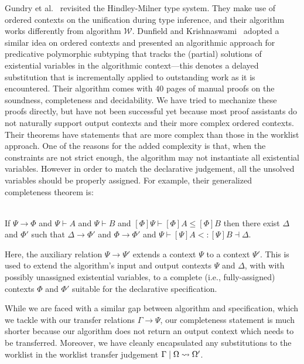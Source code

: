 Gundry et al.~\cite{gundry2010type} revisited the Hindley-Milner type system. They make use of ordered contexts on the unification during type inference, and their algorithm works differently from algorithm $\mathcal{W}$.
Dunfield and Krishnaswami~\cite{dunfield2013complete} adopted a similar idea on ordered contexts and presented an algorithmic approach for predicative polymorphic subtyping
that tracks the (partial) solutions of existential variables in the algorithmic
context---this denotes a delayed substitution that is incrementally applied
to outstanding work as it is encountered.  
Their algorithm comes with 40 pages of manual proofs on the soundness, completeness
and decidability. We have tried to
mechanize these proofs directly, but have not been successful yet because most proof assistants
do not naturally support output contexts and their more complex
ordered contexts.
Their theorems have statements that are more complex than those in the worklist
approach. One of the reasons for the added complexity is that, when the
constraints are not strict enough, the algorithm may not instantiate all
existential variables. However in order to match the declarative judgement,
all the unsolved variables should be properly assigned.
For example, their generalized completeness theorem is:
\begin{theorem}~\\
If $\Psi\longrightarrow \Phi$ and $\Psi\vdash A$ and $\Psi\vdash B$ and $[\Phi]\Psi\vdash [\Phi]A \le [\Phi]B$ then there exist $\Delta$ and $\Phi'$ such that $\Delta\longrightarrow\Phi'$ and $\Phi\longrightarrow\Phi'$ and $\Psi\vdash[\Psi]A <: [\Psi]B \dashv \Delta$.
\end{theorem}
Here, the auxiliary relation $\Psi\longrightarrow \Psi'$ extends a context
$\Psi$ to a context $\Psi'$. This is used to extend the algorithm's input and
output contexts $\Psi$ and $\Delta$, with with possibly unassigned existential
variables, to a complete (i.e., fully-assigned) contexts $\Phi$ and $\Phi'$ 
suitable for the declarative specification.

While we are faced with a similar gap between algorithm and specification,
which we tackle with our transfer relations $\Gamma \to \Psi$, our completeness
statement is much shorter because our algorithm does not return an output context
which needs to be transferred. Moreover, we have cleanly encapsulated any
substitutions to the worklist in the worklist transfer judgement $\Gamma \mid
\Omega \rightsquigarrow \Omega'$.

